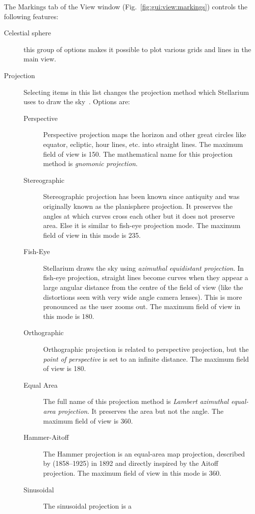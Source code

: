 The Markings tab of the View window
(Fig.~\ref{fig:gui:view:markings}) controls the following features:

\begin{description}
\item[Celestial sphere] this group of options makes it possible to
  plot various grids and lines in the main view.
\item[Projection] Selecting items in this list changes the
  projection method which Stellarium uses to draw the sky~\cite{Snyder:MapProjections}. Options are:

  \begin{description}
  \item[Perspective] Perspective projection maps the horizon and other
    great circles like equator, ecliptic, hour lines, etc. into
    straight lines. The maximum field of view is 150\degree. The
    mathematical name for this projection method is \emph{gnomonic
      projection}.
  \item[Stereographic] Stereographic projection has been known since
    antiquity and was originally known as the planisphere
    projection. It preserves the angles at which curves cross each
    other but it does not preserve area. Else it is similar to
    fish-eye projection mode. The maximum field of view in this mode
    is 235\degree.
  \item[Fish-Eye] Stellarium draws the sky using \emph{azimuthal
    equidistant projection}. In fish-eye projection, straight lines
    become curves when they appear a large angular distance from the
    centre of the field of view (like the distortions seen with very
    wide angle camera lenses). This is more pronounced as the user zooms
    out. The maximum field of view in this mode is 180\degree.
  \item[Orthographic] Orthographic projection is related to
    perspective projection, but the \emph{point of perspective} is set
    to an infinite distance. The maximum field of view is 180\degree.
  \item[Equal Area] The full name of this projection method is
    \emph{Lambert azimuthal equal-area projection}. It preserves the
    area but not the angle. The maximum field of view is 360\degree.
  \item[Hammer-Aitoff] The Hammer projection is an equal-area map
    projection, described by  (1858--1925) in 1892 and directly inspired
    by the Aitoff projection. The maximum field of view in this mode is
    360\degree.
  \item[Sinusoidal] The sinusoidal projection is a

\end{description}
\end{description}
